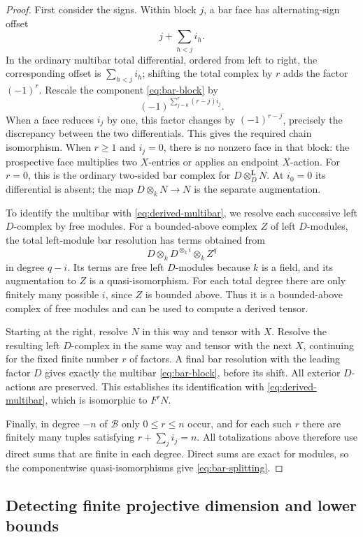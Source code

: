 \documentclass[11pt]{article}
\numberwithin{equation}{section}
\theoremstyle{definition}
\theoremstyle{remark}
\newcommand{\otL}{\otimes^{\mathbf L}}
\begin{document}
\begin{proof}
First consider the signs.  Within block \(j\), a bar face
has alternating-sign offset
\[
j+\sum_{h<j}i_h.
\]
In the ordinary multibar total differential, ordered from
left to right, the corresponding offset is
\(\sum_{h<j}i_h\); shifting the total complex by \(r\)
adds the factor \((-1)^r\).
Rescale the component \eqref{eq:bar-block} by
\[
(-1)^{\sum_{j=0}^r(r-j)i_j}.
\]
When a face reduces \(i_j\) by one, this factor changes by
\((-1)^{r-j}\), precisely the discrepancy between the
two differentials.  This gives the required chain
isomorphism.  When \(r\ge1\) and \(i_j=0\), there is no
nonzero face in that block: the prospective face multiplies
two \(X\)-entries or applies an endpoint \(X\)-action.
For \(r=0\), this is the ordinary two-sided bar complex
for \(D\otL_DN\).  At \(i_0=0\) its differential is absent;
the map \(D\otimes_kN\to N\) is the separate augmentation.

To identify the multibar with \eqref{eq:derived-multibar},
we resolve each successive left $D$-complex by free modules.
For a bounded-above complex \(Z\) of left \(D\)-modules,
the total left-module bar resolution has terms obtained
from
\[
D\otimes_k D^{\otimes_k i}\otimes_k Z^q
\]
in degree \(q-i\).  Its terms are free left \(D\)-modules
because \(k\) is a field, and its augmentation to \(Z\)
is a quasi-isomorphism.  For each total degree there are
only finitely many possible \(i\), since \(Z\) is bounded
above.  Thus it is a bounded-above complex of free
modules and can be used to compute a derived tensor.

Starting at the right, resolve \(N\) in this way and
tensor with \(X\).  Resolve the resulting left
\(D\)-complex in the same way and tensor with the next
\(X\), continuing for the fixed finite number \(r\)
of factors.  A final bar resolution with the leading
factor \(D\) gives exactly the multibar
\eqref{eq:bar-block}, before its shift.
All exterior \(D\)-actions are preserved.
This establishes its identification with
\eqref{eq:derived-multibar}, which is isomorphic to
\(F^rN\).

Finally, in degree \(-n\) of \(\mathcal B\) only
\(0\le r\le n\) occur, and for each such \(r\) there
are finitely many tuples satisfying
\(r+\sum_j i_j=n\).
All totalizations above therefore use direct sums that
are finite in each degree.
Direct sums are exact for modules, so the componentwise
quasi-isomorphisms give \eqref{eq:bar-splitting}.
\end{proof}

\subsection{Detecting finite projective dimension and lower bounds}
\end{document}
